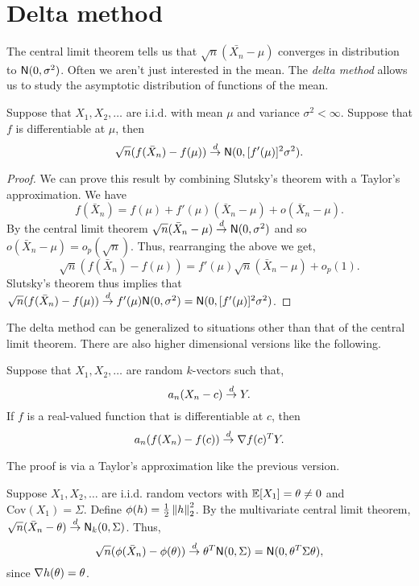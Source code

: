 \section{Delta method}
The central limit theorem tells us that $\sqrt{n}(\bar{X_n}-\mu)$ converges in distribution to $\mathsf{N}(0,\sigma^2)$. Often we aren't just interested in the mean. The \emph{delta method} allows us to study the asymptotic distribution of functions of the mean.
\begin{theorem}
    Suppose that $X_1,X_2,\ldots$ are i.i.d. with mean $\mu$ and variance $\sigma^2 < \infty$. Suppose that $f$ is differentiable at $\mu$, then 
    \[\sqrt{n}(f(\bar{X}_n)-f(\mu)) \stackrel{d}{\to} \mathsf{N}(0,[f'(\mu)]^2\sigma^2). \]
\end{theorem}
\begin{proof}
    We can prove this result by combining Slutsky's theorem with a Taylor's approximation. We have 
    \[f(\bar{X}_n) = f(\mu) + f'(\mu)(\bar{X}_n-\mu) + o(\bar{X}_n-\mu). \]
    By the central limit theorem $\sqrt{n}(\bar{X}_n - \mu) \stackrel{d}{\to} \mathsf{N}(0,\sigma^2)$ and so $o(\bar{X}_n-\mu) = o_p(\sqrt{n})$. Thus, rearranging the above we get,
    \[ \sqrt{n}(f(\bar{X}_n)-f(\mu)) = f'(\mu)\sqrt{n}(\bar{X}_n-\mu)+o_p(1).\]
    Slutsky's theorem thus implies that $\sqrt{n}(f(\bar{X}_n)-f(\mu)) \stackrel{d}{\to} f'(\mu)\mathsf{N}(0,\sigma^2) = \mathsf{N}(0,[f'(\mu)]^2\sigma^2)$.
\end{proof}
The delta method can be generalized to situations other than that of the central limit theorem. There are also higher dimensional versions like the following.
\begin{theorem}
    Suppose that $X_1,X_2,\ldots$ are random $k$-vectors such that,
    \[a_n(X_n-c) \stackrel{d}{\to} Y. \]
    If $f$ is a real-valued function that is differentiable at $c$, then
    \[a_n(f(X_n) - f(c)) \stackrel{d}{\to} \nabla f(c)^T Y. \]
\end{theorem}
The proof is via a Taylor's approximation like the previous version.
\begin{example}
    Suppose $X_1,X_2,\ldots$ are i.i.d. random vectors with ${\mathbb{E}}[X_1]={\theta} \neq 0$ and $\text{Cov}(X_1)=\Sigma$. Define $\phi(h) = \frac{1}{2}\left\|h\right\|_2^2$. By the multivariate central limit theorem, $\sqrt{n}(\bar{X}_n-{\theta}) \stackrel{d}{\to} \mathsf{N}_k(0,\Sigma)$. Thus,
    \[\sqrt{n}(\phi(\bar{X}_n)-\phi({\theta})) \stackrel{d}{\to} {\theta}^T\mathsf{N}(0, \Sigma )=\mathsf{N}(0,{\theta}^T\Sigma {\theta}),\]
    since $\nabla h({\theta}) = {\theta}$.
\end{example}

